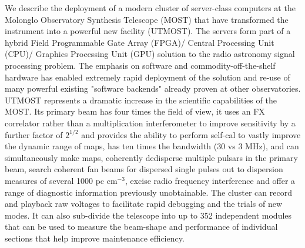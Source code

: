 We describe the deployment of a modern cluster of server-class computers at the Molonglo Observatory Synthesis Telescope (MOST) that have transformed the instrument into a powerful new facility (UTMOST). The servers form part of a hybrid Field Programmable Gate Array (FPGA)/ Central Processing Unit (CPU)/ Graphics Processing Unit (GPU) solution to the radio astronomy signal processing problem. The emphasis on software and commodity-off-the-shelf hardware has enabled extremely rapid deployment of the solution and re-use of many powerful existing "software backends" already proven at other observatories. UTMOST represents a dramatic increase in the scientific capabilities of the MOST. Its primary beam has four times the field of view, it uses an FX correlator rather than a multiplication interferometer to improve sensitivity by a further factor of $2^{1/2}$ and provides the ability to perform self-cal to vastly improve the dynamic range of maps, has ten times the bandwidth (30 vs 3 MHz), and can simultaneously make maps, coherently dedisperse multiple pulsars in the primary beam, search coherent fan beams for dispersed single pulses out to dispersion measures of several 1000 pc cm$^{-3}$, excise radio frequency interference and offer a range of diagnostic information previously unobtainable. The cluster can record and playback raw voltages to facilitate rapid debugging and the trials of new modes. It can also sub-divide the telescope into up to 352 independent modules that can be used to measure the beam-shape and performance of individual sections that help improve maintenance efficiency.
